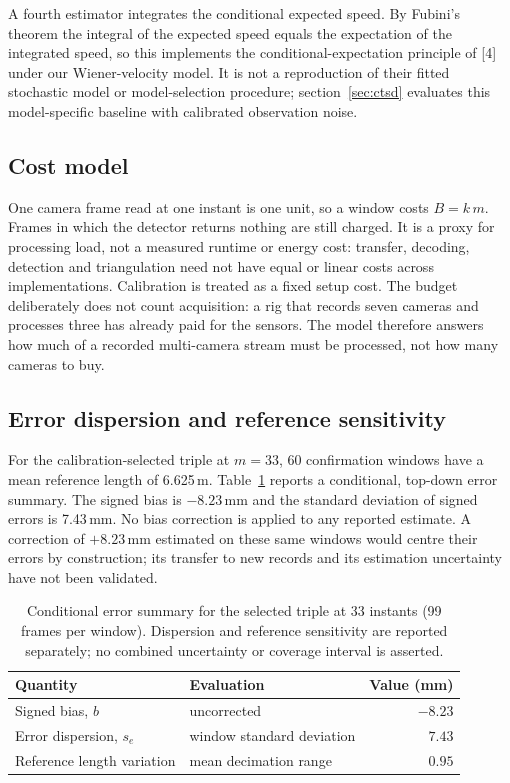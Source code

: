 \documentclass{iopjournal}
\begin{document}
A fourth estimator integrates the conditional expected speed. By Fubini's
theorem the integral of the expected speed equals the expectation of the
integrated speed, so this implements the conditional-expectation principle of [4] under our
Wiener-velocity model. It is not a reproduction of their fitted stochastic
model or model-selection procedure; section~\ref{sec:ctsd} evaluates this
model-specific baseline with calibrated observation noise.

\subsection{Cost model}
One camera frame read at one instant is one unit, so a window costs $B=k\,m$.
Frames in which the detector returns nothing are still charged. It is a proxy for processing load, not a measured runtime or energy cost:
transfer, decoding, detection and triangulation need not have equal or linear
costs across implementations. Calibration is treated as a fixed setup cost.
The budget deliberately does not count acquisition: a rig that records seven cameras and processes three has
already paid for the sensors. The model therefore answers how much of a
recorded multi-camera stream must be processed, not how many cameras to buy.

\subsection{Error dispersion and reference sensitivity}
\label{sec:uncertainty}
For the calibration-selected triple at $m=33$, 60 confirmation windows have
a mean reference length of 6.625\,m. Table~\ref{tab:uncertainty} reports a
conditional, top-down error summary. The signed bias is $-8.23$\,mm and the
standard deviation of signed errors is 7.43\,mm. No bias correction is
applied to any reported estimate. A correction of $+8.23$\,mm estimated on
these same windows would centre their errors by construction; its transfer
to new records and its estimation uncertainty have not been validated.

\begin{table}
\caption{Conditional error summary for the selected triple at 33 instants
(99 frames per window). Dispersion and reference sensitivity are reported
separately; no combined uncertainty or coverage interval is asserted.}
\centering
\begin{tabular}{llr}
\hline
Quantity & Evaluation & Value (mm)\\
\hline
Signed bias, $b$ & uncorrected & $-8.23$\\
Error dispersion, $s_e$ & window standard deviation & $7.43$\\
Reference length variation & mean decimation range & $0.95$\\
\hline
\end{tabular}
\label{tab:uncertainty}
\end{table}
\end{document}
